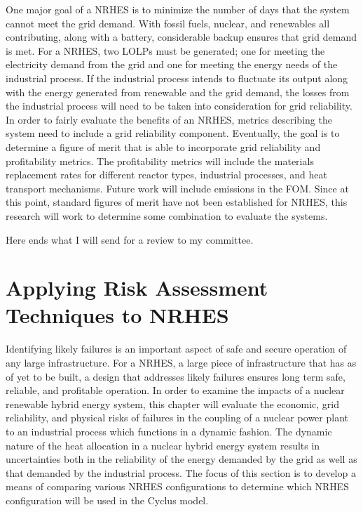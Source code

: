 \documentclass[12pt]{UIdahoMastersThesis}
\begin{document}
One major goal of a NRHES is to minimize the number of days that the system cannot meet the grid demand.  With fossil fuels, nuclear, and renewables all contributing, along with a battery, considerable backup ensures that grid demand is met. For a NRHES, two LOLPs must be generated; one for meeting the electricity demand from the grid and one for meeting the energy needs of the industrial process.  If the industrial process intends to fluctuate its output along with the energy generated from renewable and the grid demand, the losses from the industrial process will need to be taken into consideration for grid reliability. In order to fairly evaluate the benefits of an NRHES, metrics describing the system need to include a grid reliability component.
Eventually, the goal is to determine a figure of merit that is able to incorporate grid reliability and profitability metrics.  The profitability metrics will include the materials replacement rates for different reactor types, industrial processes, and heat transport mechanisms. Future work will include emissions in the FOM. Since at this point, standard figures of merit have not been established for NRHES, this research will work to determine some combination to evaluate the systems.


Here ends what I will send for a review to my committee.

\chapter{Applying Risk Assessment Techniques to NRHES}
Identifying likely failures is an important aspect of safe and secure operation of any large infrastructure. For a NRHES, a large piece of infrastructure that has as of yet to be built, a design that addresses likely failures ensures long term safe, reliable, and profitable operation.   In order to examine the impacts of a nuclear renewable hybrid energy system, this chapter will evaluate the economic, grid reliability, and physical risks of failures in the coupling of a nuclear power plant to an industrial process which functions in a dynamic fashion. The dynamic nature of the heat allocation in a nuclear hybrid energy system results in uncertainties both in the reliability of the energy demanded by the grid as well as that demanded by the industrial process. The focus of this section is to develop a means of comparing various NRHES configurations to determine which NRHES configuration will be used in the Cyclus model.
\end{document}
